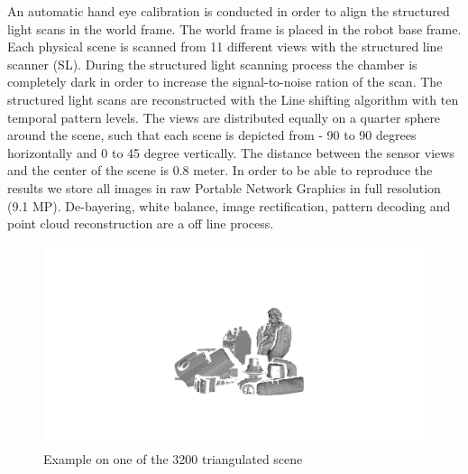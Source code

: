 \documentclass[10pt,twocolumn,letterpaper]{article}
\begin{document}
An automatic hand eye calibration \cite{DornaikaHoraud1998} is conducted in order to align the structured light scans in the world frame. The world frame is placed in the robot base frame. Each physical scene is scanned from 11 different views with the structured line scanner (SL). During the structured light scanning process the chamber is completely dark in order to increase the signal-to-noise ration of the scan. The structured light scans are reconstructed with the Line shifting algorithm \cite{Guehring2000} with ten temporal pattern levels. The views are distributed equally on a quarter sphere around the scene, such that each scene is depicted from - 90 to 90 degrees horizontally and 0 to 45 degree vertically. The distance between the sensor views and the center of the scene is 0.8 meter. In order to be able to reproduce the results we store all images in raw Portable Network Graphics in full resolution (9.1 MP). De-bayering, white balance, image rectification, pattern decoding and point cloud reconstruction are a off line process.   
\begin{figure}[ht]
\centering
\includegraphics[clip, trim=12cm 6cm 12cm 8cm,width=1.0\linewidth, height= 1.0\linewidth, keepaspectratio]{img/mesh_scene.png}
\caption{Example on one of the 3200 triangulated scene}
\label{fig:mesh_scene}
\end{figure}
\end{document}
